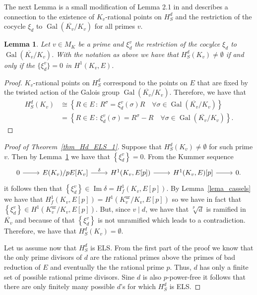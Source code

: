 \documentclass[a4paper, 12pt]{amsart}
\newtheorem{lemma}[theorem]{Lemma}
\theoremstyle{definition}
\theoremstyle{remark}
\DeclareMathOperator{\im}{Im}
\newcommand{\GalKv}{\operatorname{Gal}(\overline{K_v}/K_v)}
\numberwithin{equation}{section}
\begin{document}
The next Lemma is a small modification of Lemma 2.1 in \cite{ciperiani2015local} and describes a connection to the existence of $K_v$-rational points on $H_S^d$ and the restriction of the cocycle $\xi_d$ to $\GalKv$ for all primes $v$.
\begin{lemma}\label{lema_1}
    Let $v \in M_K$ be a prime and $\xi_d^v$ the restriction of the cocylce $\xi_d$ to $\GalKv$. With the notation as above we have that $H_S^d(K_v) \neq \emptyset$ if and only if the $\{\xi_d^v\}=0$ in $H^1(K_v, E)$.
\end{lemma}
\begin{proof}
    $K_v$-rational points on $H_S^d$ correspond to the points on $E$ that are fixed by the twisted action of the Galois group $\GalKv$. Therefore, we have that
    \begin{align*}
        H_S^d(K_v) &\cong \left\{ R\in E\, :\, R^\sigma = \xi_d^v(\sigma)R \quad \forall \sigma \in \GalKv \right\}\\
        &= \left\{ R\in E\, :\, \xi_d^v(\sigma) = R^\sigma - R \quad \forall \sigma \in \GalKv \right\}.
    \end{align*}
\end{proof}

\begin{proof}[Proof of Theorem~\ref{thm_Hd_ELS_1}]
    Suppose that $H_S^d(K_v)\neq \emptyset$ for such prime $v$. Then by Lemma~\ref{lema_1} we have that $\left\{\xi_d^v\right\}= 0$. From the Kummer sequence 
    \[
        \begin{tikzcd}
            0 \arrow[r] & E(K_v)/pE[K_v] \arrow[r, "\delta"] & H^1(K_v,E[p]) \arrow[r] & H^1(K_v,E)[p] \arrow[r] & 0.
        \end{tikzcd}    
    \]
    it follows then that $\left\{\xi_d^v\right\} \in \im{\delta} = H_f^1(K_v, E[p])$.
    By Lemma~\ref{lema_cassels} we have that $ H_f^1(K_v, E[p])=H^1(K_v^{\operatorname{ur}}/K_v, E[p])$ so we have in fact that $\left\{\xi_d^v\right\} \in H^1(K_v^{\operatorname{ur}}/K_v, E[p])$. But, since $v \mid d$, we have that $\sqrt[p]{d}$ is ramified in $\overline{K_v}$ and because of that $\left\{\xi_d^v\right\}$ is not unramified which leads to a contradiction.
    Therefore, we have that $H_S^d(K_v) = \emptyset$.

    Let us assume now that $H_S^d$ is ELS. From the first part of the proof we know that the only prime divisors of $d$ are the rational primes above the primes of bad reduction of $E$ and eventually the the rational prime $p$. Thus, $d$ has only a finite set of possible rational prime divisors. Sine $d$ is also $p$-power-free it follows that there are only finitely many possible $d$'s for which $H_S^d$ is ELS.  
\end{proof}
\end{document}
